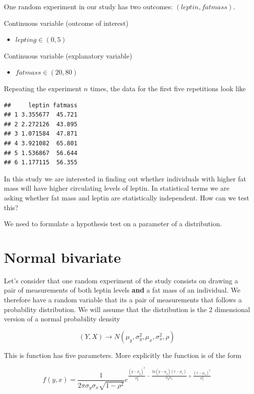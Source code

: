 \documentclass[
]{book}
\providecommand{\tightlist}{%
  \setlength{\itemsep}{0pt}\setlength{\parskip}{0pt}}
\begin{document}
One random experiment in our study has two outcomes: \((leptin, fatmass)\).

Continuous variable (outcome of interest)

\begin{itemize}
\tightlist
\item
  \(lepting \in (0, 5)\)
\end{itemize}

Continuous variable (explanatory variable)

\begin{itemize}
\tightlist
\item
  \(fatmass \in (20,80)\)
\end{itemize}

Repeating the experiment \(n\) times, the data for the first five repetitions look like

\begin{verbatim}
##     leptin fatmass
## 1 3.355677  45.721
## 2 2.272126  43.895
## 3 1.071584  47.871
## 4 3.921082  65.801
## 5 1.536867  56.644
## 6 1.177115  56.355
\end{verbatim}

In this study we are interested in finding out whether individuals with higher fat mass will have higher circulating levels of leptin. In statistical terms we are asking whether fat mass and leptin are statistically independent. How can we test this?

We need to formulate a hypothesis test on a parameter of a distribution.

\hypertarget{normal-bivariate}{%
\section{Normal bivariate}\label{normal-bivariate}}

Let's consider that one random experiment of the study consists on drawing a pair of measurements of both leptin levels \textbf{and} a fat mass of an individual. We therefore have a random variable that its a pair of measurements that follows a probability distribution. We will assume that the distribution is the 2 dimensional version of a normal probability density

\[(Y, X) \rightarrow N(\mu_y, \sigma^2_y, \mu_x, \sigma^2_x, \rho)\]

This is function has five parameters. More explicitly the function is of the form

\[f(y,x)=\frac{1}{2\pi \sigma_y\sigma_x \sqrt{1-\rho^2}}e^{\frac{(y-\mu_y)^2}{\sigma_y^2}-\frac{2\rho(y-\mu_y)(x-\mu_x)}{\sigma_y\sigma_x}+\frac{(x-\mu_x)^2}{\sigma_x^2}}\]
\end{document}
